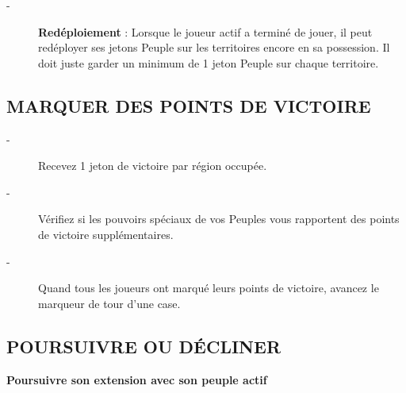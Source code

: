 \documentclass{scrartcl}%
\begin{document}
\begin{description}%
\item[{-} ]%
%
\textcolor{mygreen}{%
\textbf{Redéploiement}%
}%
\textit{ }%
 : Lorsque le joueur actif a terminé de jouer, il peut redéployer ses jetons Peuple sur les territoires encore en sa possession. Il doit juste garder un minimum de 1 jeton Peuple sur chaque territoire.
%
\end{description}

%
\subsection{ MARQUER DES POINTS DE VICTOIRE
}%
\label{subsec:MARQUERDESPOINTSDEVICTOIRE}%
\begin{description}%
\item[{-} ]%
%
 Recevez 1 jeton de victoire par région occupée.
%
\item[{-} ]%
%
 Vérifiez si les pouvoirs spéciaux de vos Peuples vous rapportent des points de victoire supplémentaires.
%
\item[{-} ]%
%
 Quand tous les joueurs ont marqué leurs points de victoire, avancez le marqueur de tour d'une case.
%
\end{description}

%
\subsection{ POURSUIVRE OU DÉCLINER
}%
\label{subsec:POURSUIVREOUDCLINER}%
\textcolor{mygreen}{%
\textbf{Poursuivre son extension avec son peuple actif}%
}%
\end{document}
